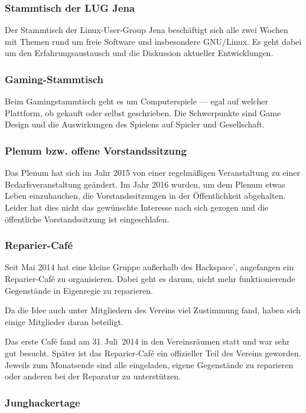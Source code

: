 \documentclass[ngerman]{scrartcl}
\begin{document}
\subsubsection{Stammtisch der LUG Jena}

Der Stammtisch der Linux-User-Group Jena beschäftigt sich alle zwei
Wochen mit Themen rund um freie Software und insbesondere
GNU/Linux. Es geht dabei um den Erfahrungsaustausch und die Diskussion
aktueller Entwicklungen.

\subsubsection{Gaming-Stammtisch}

Beim Gamingstammtisch geht es um Computerspiele — egal auf welcher
Plattform, ob gekauft oder selbst geschrieben. Die Schwerpunkte sind
Game Design und die Auswirkungen des Spielens auf Spieler und
Gesellschaft.

\subsubsection{Plenum bzw. offene Vorstandssitzung}

Das Plenum hat sich im Jahr 2015 von einer regelmäßigen Veranstaltung
zu einer Bedarfsveranstaltung geändert. Im Jahr 2016 wurden, um dem
Plenum etwas Leben einzuhauchen, die Vorstandssitzungen in der
Öffentlichkeit abgehalten. Leider hat dies nicht das gewünschte
Interesse nach sich gezogen und die öffentliche Vorstandssitzung ist
eingeschlafen.

\subsubsection{Reparier-Café}

Seit Mai 2014 hat eine kleine Gruppe außerhalb des Hackspace',
angefangen ein Reparier-Café zu organisieren. Dabei geht es darum,
nicht mehr funktionierende Gegenstände in Eigenregie zu reparieren.

Da die Idee auch unter Mitgliedern des Vereins viel Zustimmung fand,
haben sich einige Mitglieder daran beteiligt.

Das erste Café fand am 31.\,Juli~2014 in den Vereinsräumen statt und
war sehr gut besucht.  Später ist das Reparier-Café ein offizieller
Teil des Vereins geworden. Jeweils zum Monatsende sind alle
eingeladen, eigene Gegenstände zu reparieren oder anderen bei der
Reparatur zu unterstützen.

\subsubsection{Junghackertage}
\end{document}
